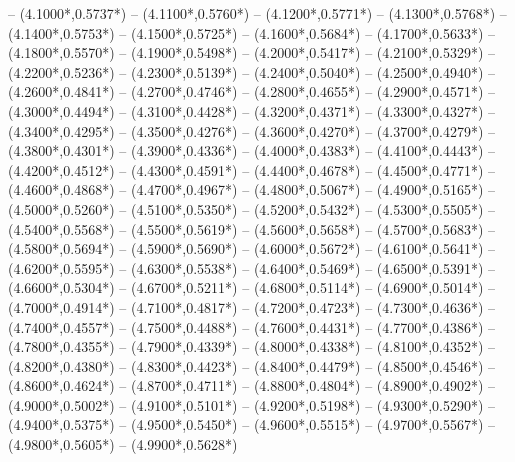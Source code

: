 {	-- ({4.1000*\dx},{0.5737*\dy})
	-- ({4.1100*\dx},{0.5760*\dy})
	-- ({4.1200*\dx},{0.5771*\dy})
	-- ({4.1300*\dx},{0.5768*\dy})
	-- ({4.1400*\dx},{0.5753*\dy})
	-- ({4.1500*\dx},{0.5725*\dy})
	-- ({4.1600*\dx},{0.5684*\dy})
	-- ({4.1700*\dx},{0.5633*\dy})
	-- ({4.1800*\dx},{0.5570*\dy})
	-- ({4.1900*\dx},{0.5498*\dy})
	-- ({4.2000*\dx},{0.5417*\dy})
	-- ({4.2100*\dx},{0.5329*\dy})
	-- ({4.2200*\dx},{0.5236*\dy})
	-- ({4.2300*\dx},{0.5139*\dy})
	-- ({4.2400*\dx},{0.5040*\dy})
	-- ({4.2500*\dx},{0.4940*\dy})
	-- ({4.2600*\dx},{0.4841*\dy})
	-- ({4.2700*\dx},{0.4746*\dy})
	-- ({4.2800*\dx},{0.4655*\dy})
	-- ({4.2900*\dx},{0.4571*\dy})
	-- ({4.3000*\dx},{0.4494*\dy})
	-- ({4.3100*\dx},{0.4428*\dy})
	-- ({4.3200*\dx},{0.4371*\dy})
	-- ({4.3300*\dx},{0.4327*\dy})
	-- ({4.3400*\dx},{0.4295*\dy})
	-- ({4.3500*\dx},{0.4276*\dy})
	-- ({4.3600*\dx},{0.4270*\dy})
	-- ({4.3700*\dx},{0.4279*\dy})
	-- ({4.3800*\dx},{0.4301*\dy})
	-- ({4.3900*\dx},{0.4336*\dy})
	-- ({4.4000*\dx},{0.4383*\dy})
	-- ({4.4100*\dx},{0.4443*\dy})
	-- ({4.4200*\dx},{0.4512*\dy})
	-- ({4.4300*\dx},{0.4591*\dy})
	-- ({4.4400*\dx},{0.4678*\dy})
	-- ({4.4500*\dx},{0.4771*\dy})
	-- ({4.4600*\dx},{0.4868*\dy})
	-- ({4.4700*\dx},{0.4967*\dy})
	-- ({4.4800*\dx},{0.5067*\dy})
	-- ({4.4900*\dx},{0.5165*\dy})
	-- ({4.5000*\dx},{0.5260*\dy})
	-- ({4.5100*\dx},{0.5350*\dy})
	-- ({4.5200*\dx},{0.5432*\dy})
	-- ({4.5300*\dx},{0.5505*\dy})
	-- ({4.5400*\dx},{0.5568*\dy})
	-- ({4.5500*\dx},{0.5619*\dy})
	-- ({4.5600*\dx},{0.5658*\dy})
	-- ({4.5700*\dx},{0.5683*\dy})
	-- ({4.5800*\dx},{0.5694*\dy})
	-- ({4.5900*\dx},{0.5690*\dy})
	-- ({4.6000*\dx},{0.5672*\dy})
	-- ({4.6100*\dx},{0.5641*\dy})
	-- ({4.6200*\dx},{0.5595*\dy})
	-- ({4.6300*\dx},{0.5538*\dy})
	-- ({4.6400*\dx},{0.5469*\dy})
	-- ({4.6500*\dx},{0.5391*\dy})
	-- ({4.6600*\dx},{0.5304*\dy})
	-- ({4.6700*\dx},{0.5211*\dy})
	-- ({4.6800*\dx},{0.5114*\dy})
	-- ({4.6900*\dx},{0.5014*\dy})
	-- ({4.7000*\dx},{0.4914*\dy})
	-- ({4.7100*\dx},{0.4817*\dy})
	-- ({4.7200*\dx},{0.4723*\dy})
	-- ({4.7300*\dx},{0.4636*\dy})
	-- ({4.7400*\dx},{0.4557*\dy})
	-- ({4.7500*\dx},{0.4488*\dy})
	-- ({4.7600*\dx},{0.4431*\dy})
	-- ({4.7700*\dx},{0.4386*\dy})
	-- ({4.7800*\dx},{0.4355*\dy})
	-- ({4.7900*\dx},{0.4339*\dy})
	-- ({4.8000*\dx},{0.4338*\dy})
	-- ({4.8100*\dx},{0.4352*\dy})
	-- ({4.8200*\dx},{0.4380*\dy})
	-- ({4.8300*\dx},{0.4423*\dy})
	-- ({4.8400*\dx},{0.4479*\dy})
	-- ({4.8500*\dx},{0.4546*\dy})
	-- ({4.8600*\dx},{0.4624*\dy})
	-- ({4.8700*\dx},{0.4711*\dy})
	-- ({4.8800*\dx},{0.4804*\dy})
	-- ({4.8900*\dx},{0.4902*\dy})
	-- ({4.9000*\dx},{0.5002*\dy})
	-- ({4.9100*\dx},{0.5101*\dy})
	-- ({4.9200*\dx},{0.5198*\dy})
	-- ({4.9300*\dx},{0.5290*\dy})
	-- ({4.9400*\dx},{0.5375*\dy})
	-- ({4.9500*\dx},{0.5450*\dy})
	-- ({4.9600*\dx},{0.5515*\dy})
	-- ({4.9700*\dx},{0.5567*\dy})
	-- ({4.9800*\dx},{0.5605*\dy})
	-- ({4.9900*\dx},{0.5628*\dy})
}

